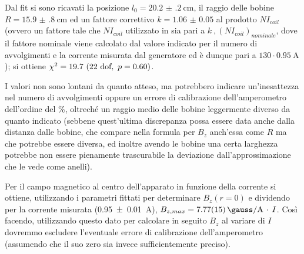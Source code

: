 Dal fit si sono ricavati la posizione $l_0 = \SI{20.2(2)}{\cm} $, il raggio delle bobine $R = \SI{15.9(8)}{\cm}$ ed un fattore correttivo $k = \num{1.06(5)}$ al prodotto $N I_{coil}$ (ovvero un fattore tale che $N I_{coil}$ utilizzato in  sia pari a $k\ , (N I_{coil})_{nominale}$, dove il fattore nominale viene calcolato dal valore indicato per il numero di avvolgimenti e la corrente misurata dal generatore ed è dunque pari a $130 \cdot  \SI{0.95}{\A}$); si ottiene $\chi^2 = 19.7 \ (22 \text{ dof} , \  p = 0.60)$.

I valori non sono lontani da quanto atteso, ma potrebbero indicare un'inesattezza nel numero di avvolgimenti oppure un errore di calibrazione dell'amperometro dell'ordine del \%, oltreché un raggio medio delle bobine leggermente diverso da quanto indicato (sebbene quest'ultima discrepanza possa essere data anche dalla distanza dalle bobine, che compare nella formula per $B_z$ anch'essa come $R$ ma che potrebbe essere diversa, ed inoltre avendo le bobine una certa larghezza potrebbe non essere pienamente trascurabile la deviazione dall'approssimazione che le vede come anelli).

Per il campo magnetico al centro dell'apparato in funzione della corrente si ottiene, utilizzando i parametri fittati per determinare $B_z(r=0)$ e dividendo per la corrente misurata (\SI{0.95(1)}{\A}), $B_{z,max} = \SI{7.77(15)}{\gauss\per\A} \, \cdot \, I$.
Così facendo, utilizzando questo dato per calcolare in seguito $B_z$ al variare di $I$ dovremmo escludere l'eventuale errore di calibrazione dell'amperometro (assumendo che il suo zero sia invece sufficientemente preciso).
